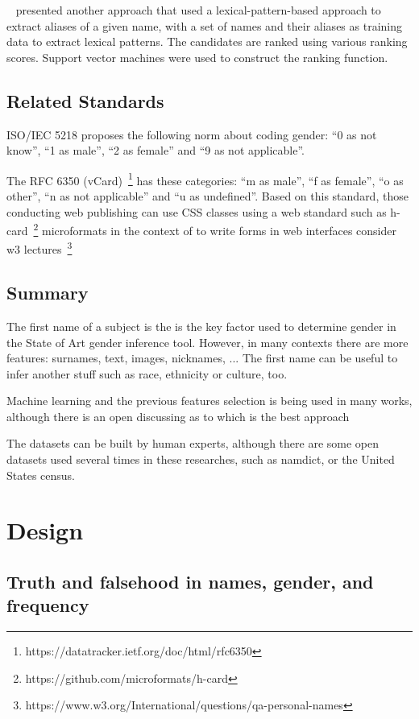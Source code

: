 \documentclass[a4paper]{article}
\begin{document}
~\cite{bollegala2010automatic} presented another approach that
used a lexical-pattern-based approach to extract aliases of a
given name, with a set of names and their aliases as training
data to extract lexical patterns. The candidates are ranked
using various ranking scores. Support vector machines were
used to construct the ranking function.

\subsection{Related Standards}

ISO/IEC 5218 proposes the following norm about coding
gender: ``0 as not know'', ``1 as male'', ``2 as female''
and ``9 as not applicable''.

The RFC 6350
(vCard)~\footnote{https://datatracker.ietf.org/doc/html/rfc6350}
has these categories: ``m as male'', ``f as
female'', ``o as other'', ``n as not applicable'' and ``u as
undefined''. Based on this standard, those conducting web
publishing can use CSS classes using a web standard such as
h-card~\footnote{https://github.com/microformats/h-card}
microformats in the context of to write forms in web interfaces
consider w3 lectures~\footnote{https://www.w3.org/International/questions/qa-personal-names}

\subsection{Summary}

The first name of a subject is the is the key factor used to
determine gender in the State of Art gender inference tool.
However, in many contexts there are more features: surnames,
text, images, nicknames, ... The first name can be useful to
infer another stuff such as race, ethnicity or culture, too.

Machine learning and the previous features selection is being
used in many works, although there is an open discussing as
to which is the best approach

The datasets can be built by human experts, although there are
some open datasets used several times in these researches, such as
namdict, or the United States census.

\section{Design}
\label{sec:design}

\subsection{Truth and falsehood in names, gender, and frequency}
\label{sec:truthandfalsehood}
\end{document}

